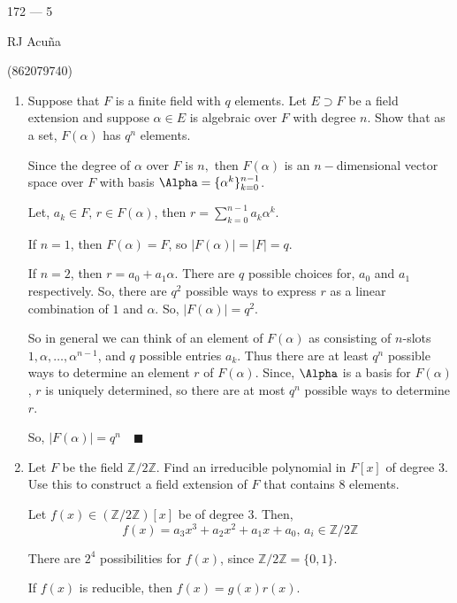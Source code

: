 \documentclass{article}
\newcommand\Z{\mathbb{Z}}
\begin{document}
\begin{center}
  172 --- 5

  RJ Acuña

  (862079740)
\end{center}\vspace{1.618em}

\begin{enumerate}

\item Suppose that $F$ is a finite field with $q$ elements. Let $E
  \supset F$ be a field extension and suppose $\alpha \in E$ is
  algebraic over $F$ with degree $n$. Show that as a set, $F(\alpha)$
  has $q^n$ elements.


    Since the degree of $\alpha$ over $F$ is $n,$ then $F(\alpha)$ is
    an $n-$dimensional vector space over $F$ with basis $\Alpha = \{\alpha^k\}_{k=0}^{n-1}$.

    Let, $a_k\in F,\, r\in F(\alpha)$, then $r = \sum_{k=0}^{n-1}a_k
    \alpha^k$.

    If $n=1$, then $F(\alpha) = F$, so $|F(\alpha)| = |F| = q$.

    If $n=2$, then $r= a_0 + a_1\alpha$. There are $q$ possible
    choices for, $a_0$ and $a_1$ respectively. So, there are $q^2$
    possible ways to express $r$ as a linear combination of $1$ and
    $\alpha$. So, $|F(\alpha)| = q^2$.

    So in general we can think of an element of $F(\alpha)$ as
    consisting of $n$-slots $1,\alpha,\dots,\alpha^{n-1}$, and $q$
    possible entries $a_k$. Thus there are at least $q^n$ possible ways to determine
    an element $r$ of $F(\alpha)$. Since, $\Alpha$ is a basis for
    $F(\alpha)$, $r$ is uniquely determined, so there are at most
    $q^n$ possible ways to determine $r$.

    So, $|F(\alpha)|= q^n\quad \blacksquare$

\item Let $F$ be the field $\Z/2\Z$. Find an irreducible polynomial in $F[x]$ of degree 3. Use this to construct a field extension of $F$ that contains 8 elements.


  Let $f(x) \in (\Z/2\Z)[x]$ be of degree $3$. Then,
  \[f(x) = a_3x^3 + a_2 x^2 + a_1 x + a_0,\, a_i \in \Z/2\Z\]

  There are $2^4$ possibilities for $f(x)$, since $\Z/2\Z = \{0,1\}.$

  If $f(x)$ is reducible, then $f(x) = g(x)r(x)$.


\end{enumerate}
\end{document}
